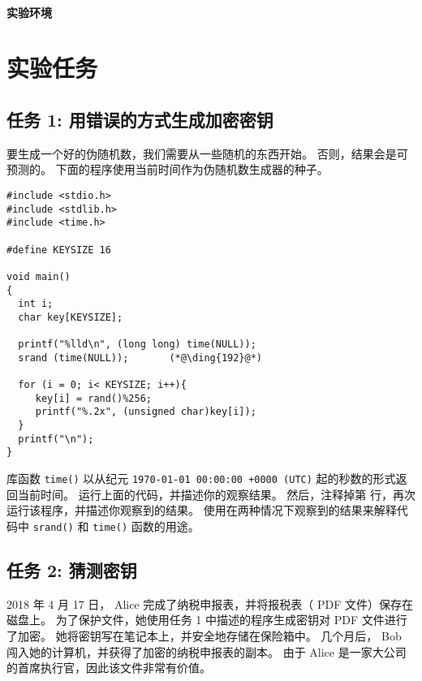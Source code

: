 \paragraph{实验环境} \seedenvironmentB


\section{实验任务}



\subsection{任务 1: 用错误的方式生成加密密钥}

要生成一个好的伪随机数，我们需要从一些随机的东西开始。
否则，结果会是可预测的。
下面的程序使用当前时间作为伪随机数生成器的种子。


\begin{lstlisting}[caption="生成一个 128 bit 的加密密钥", label=enc:code:key_gen]
#include <stdio.h>
#include <stdlib.h>
#include <time.h>

#define KEYSIZE 16

void main()
{
  int i;
  char key[KEYSIZE];

  printf("%lld\n", (long long) time(NULL));
  srand (time(NULL));       (*@\ding{192}@*)

  for (i = 0; i< KEYSIZE; i++){
     key[i] = rand()%256;
     printf("%.2x", (unsigned char)key[i]);
  }
  printf("\n");
}
\end{lstlisting}


库函数 \texttt{time()} 以从纪元 \texttt{1970-01-01 00:00:00 +0000 (UTC)} 起的秒数的形式返回当前时间。
运行上面的代码，并描述你的观察结果。
然后，注释掉第  行，再次运行该程序，并描述你观察到的结果。
使用在两种情况下观察到的结果来解释代码中 \texttt{srand()} 和 \texttt{time()} 函数的用途。



\subsection{任务 2: 猜测密钥}


2018 年 4 月 17 日， Alice 完成了纳税申报表，并将报税表（ PDF 文件）保存在磁盘上。
为了保护文件，她使用任务 1 中描述的程序生成密钥对 PDF 文件进行了加密。
她将密钥写在笔记本上，并安全地存储在保险箱中。
几个月后， Bob 闯入她的计算机，并获得了加密的纳税申报表的副本。
由于 Alice 是一家大公司的首席执行官，因此该文件非常有价值。


